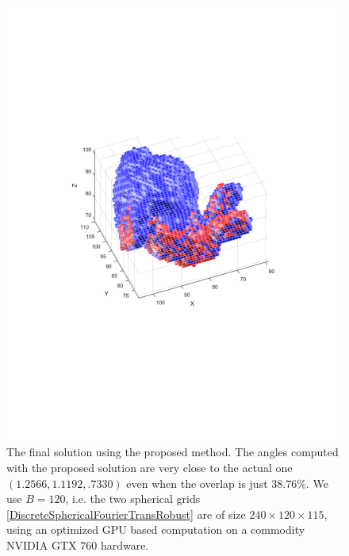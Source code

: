 \documentclass{UCF_ETD}
\begin{document}
\begin{figure}[H] 
\begin{center}
\includegraphics[scale=0.8]{RobustRegistration/FinalProposedMethodBunnyResults}
\caption{ The final solution using the proposed method. The angles computed with the proposed solution are very close to the actual one $(1.2566, 1.1192,.7330)$ even when the overlap is just $38.76\%$. We use $B = 120$, i.e. the two spherical grids \eqref{DiscreteSphericalFourierTransRobust} are of size $240 \times 120 \times 115 $, using an optimized GPU based computation on a commodity NVIDIA GTX $760$ hardware.  }
\label{SuccessofProposedMethodAgainstGo-ICP.fig}
\end{center}
\end{figure}
\end{document}
